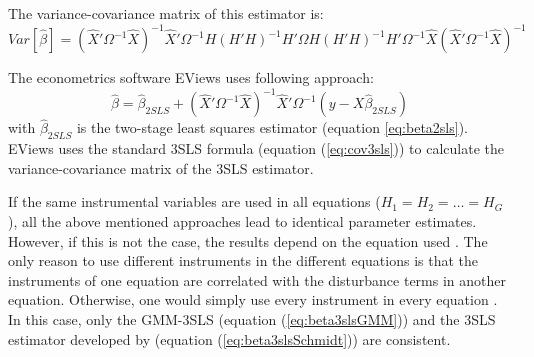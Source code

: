 The variance-covariance matrix of this estimator is:
\begin{equation}
   Var \left[ \widehat{\beta} \right] = 
   \left( \widehat{X}' \Omega^{-1}  \widehat{X} \right)^{-1} 
   \widehat{X}' \Omega^{-1} H \left( H' H \right)^{-1} H' \Omega 
   H \left( H' H \right)^{-1} H' \Omega^{-1} \widehat{X}
   \left( \widehat{X}' \Omega^{-1}  \widehat{X} \right)^{-1}
\end{equation}


The econometrics software EViews uses following approach:
\begin{equation}
   \widehat{\beta} = \widehat{\beta}_{2SLS} + 
   \left( \widehat{X}' \Omega^{-1} \widehat{X} \right)^{-1} 
   \widehat{X}' \Omega^{-1} \left( y - X \widehat{\beta}_{2SLS} \right)
\end{equation}
with $\widehat{\beta}_{2SLS}$ is the two-stage least squares estimator
(equation \ref{eq:beta2sls}).
EViews uses the standard 3SLS formula (equation (\ref{eq:cov3sls})) to 
calculate the variance-covariance matrix of the 3SLS estimator.


If the same instrumental variables are used in all equations 
($H_1 = H_2 = \ldots = H_G$), 
all the above mentioned approaches lead to identical parameter estimates.
However, if this is not the case, the results depend on the 
equation used \citep{schmidt90}. 
The only reason to use different instruments in the different equations 
is that the instruments of one equation are correlated with the
disturbance terms in another equation. Otherwise, one would simply use
every instrument in every equation \citep{schmidt90}. 
In this case, only the GMM-3SLS (equation (\ref{eq:beta3slsGMM}))
and the 3SLS estimator developed by \cite{schmidt90} 
(equation (\ref{eq:beta3slsSchmidt})) are consistent.


